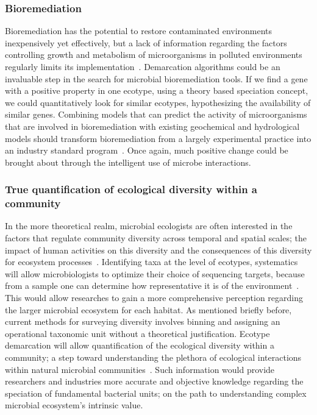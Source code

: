 \subsubsection*{Bioremediation}
Bioremediation has the potential to restore contaminated environments inexpensively yet effectively, but a lack of information regarding the factors controlling growth and metabolism of microorganisms in polluted environments regularly limits its implementation~\cite{lovley2003cleaning}.
Demarcation algorithms could be an invaluable step in the search for microbial bioremediation tools.
If we find a gene with a positive property in one ecotype, using a theory based speciation concept, we could quantitatively look for similar ecotypes, hypothesizing the availability of similar genes.
Combining models that can predict the activity of microorganisms that are involved in bioremediation with existing geochemical and hydrological models should transform bioremediation from a largely experimental practice into an industry standard program~\cite{lovley2003cleaning}.
Once again, much positive change could be brought about through the intelligent use of microbe interactions.

\subsubsection*{True quantification of ecological diversity within a community}
In the more theoretical realm, microbial ecologists are often interested in the factors that regulate community diversity across temporal and spatial scales; the impact of human activities on this diversity and the consequences of this diversity for ecosystem processes~\cite{bohannan2003new}.
Identifying taxa at the level of ecotypes, systematics will allow microbiologists to optimize their choice of sequencing targets, because from a sample one can determine how representative it is of the environment~\cite{bohannan2003new}.
This would allow researches to gain a more comprehensive perception regarding the larger microbial ecosystem for each habitat.
As mentioned briefly before, current methods for surveying diversity involves binning and assigning an operational taxonomic unit without a theoretical justification.
Ecotype demarcation will allow quantification of the ecological diversity within a community; a step toward understanding the plethora of ecological interactions within natural microbial communities~\cite{cohan2007systematics}.
Such information would provide researchers and industries more accurate and objective knowledge regarding the speciation of fundamental bacterial units; on the path to understanding complex microbial ecosystem's intrinsic value.


